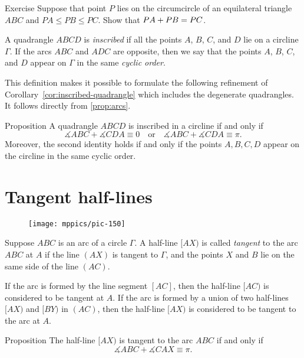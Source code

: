 \begin{thm}{Exercise}\label{ex:a+b=c}
Suppose that point $P$ lies on the circumcircle of an equilateral triangle $ABC$
and $PA\le PB\le PC$.
Show that $PA+PB\z=PC$.
\end{thm}

A quadrangle $ABCD$ is 
\emph{inscribed}
if all the points $A$, $B$, $C$, and $D$ lie on a circline $\Gamma$.
If the arcs $ABC$ and $ADC$ are opposite, then we say that the points $A$, $B$, $C$, and $D$ appear on $\Gamma$ in the same \emph{cyclic order}.

This definition makes it possible to formulate the following refinement of Corollary~\ref{cor:inscribed-quadrangle} which includes the degenerate quadrangles.
It follows directly from \ref{prop:arcs}.

\begin{thm}{Proposition}\label{prop:inscribed-quadrangle}
A quadrangle $ABCD$ is inscribed in a circline if and only if 
\[\measuredangle ABC+\measuredangle CDA\equiv 0
\quad\text{or}\quad
\measuredangle ABC+\measuredangle CDA\equiv\pi.\]
Moreover, the second identity holds if and only if the points $A,B,C,D$ appear on the circline in the same cyclic order.
\end{thm}

\section{Tangent half-lines}

\begin{wrapfigure}[6]{r}{30mm}
\vskip-10mm
\centering
\texttt{[image: mppics/pic-150]}
\end{wrapfigure}

Suppose $ABC$ is an arc of a circle $\Gamma$.
A half-line $[AX)$ is called 
\emph{tangent} 
to the arc $ABC$ at $A$
if the line $(AX)$ is tangent to $\Gamma$, and the points $X$ and $B$ lie on the same side of the line $(AC)$.

If the arc is formed by the line segment $[AC]$, then the half-line $[AC)$ is considered to be tangent at $A$.
If the arc is formed by a union of two half-lines $[AX)$ and $[BY)$ in $(AC)$,
then the half-line $[AX)$ is considered to be tangent to the arc at $A$.

\begin{thm}{Proposition}\label{prop:arc(angle=tan)}
The half-line $[AX)$ is tangent to the arc $ABC$ if and only if 
$$\measuredangle ABC+\measuredangle CAX\equiv \pi.$$

\end{thm}

